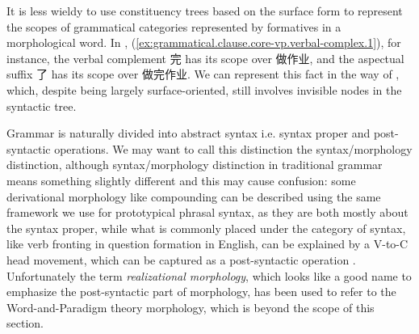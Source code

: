 \documentclass[UTF8, a4paper, oneside, scheme=plain, 12pt]{ctexrep}
\newcommand*{\citepage}[1]{p.~{#1}}
\newcommand*{\term}[1]{\emph{#1}}
\begin{document}
{It is less wieldy to use constituency trees based on the surface form to represent 
the scopes of grammatical categories represented by formatives
in a morphological word.
In , (\ref{ex:grammatical.clause.core-vp.verbal-complex.1}),
for instance, the verbal complement 完 has its scope over 做作业,
and the aspectual suffix 了 has its scope over 做完作业.
We can represent this fact in the way of ,
which, despite being largely surface-oriented, still involves invisible nodes in the syntactic tree. 

Grammar is naturally divided into abstract syntax i.e. syntax proper and post-syntactic operations.
We may want to call this distinction the syntax/morphology distinction,
although syntax/morphology distinction in traditional grammar means something slightly different and
this may cause confusion: some derivational morphology like compounding can be described using the same framework we use for prototypical phrasal syntax,
as they are both mostly about the syntax proper,
while what is commonly placed under the category of syntax,
like verb fronting in question formation in English,
can be explained by a V-to-C head movement, which can be captured as a post-syntactic operation 
\citep[\citepage{24}]{siddiqi2009syntax}.
Unfortunately the term \term{realizational morphology},
which looks like a good name to emphasize the post-syntactic part of morphology, 
has been used to refer to the Word-and-Paradigm theory morphology,
which is beyond the scope of this section.

}
\end{document}
